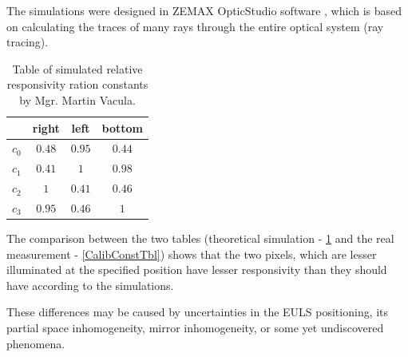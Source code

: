 \par
The simulations were designed in ZEMAX OpticStudio software \cite{zemax}, which is based on calculating the traces of many rays through the entire optical system (ray tracing).



\begin{table}[H]
\centering
\begin{tabular}{|c|c|c|c|}
\hline
   & right & left & bottom \\ \hline
$c_0$ & $0.48$    & $0.95$   & $0.44$     \\ \hline
$c_1$ & $0.41$    & $1$   	 & $0.98$      \\ \hline
$c_2$ & $1$    	  & $0.41$   & $0.46$      \\ \hline
$c_3$ & $0.95$    & $0.46$   & $1$      \\ \hline
\end{tabular}
\caption{Table of simulated relative responsivity ration constants by Mgr. Martin Vacula.}
 \label{CalibConstTblSim}
\end{table}

The comparison between the two tables (theoretical simulation - \ref{CalibConstTblSim} and the real measurement - \ref{CalibConstTbl}) shows that the two pixels, which are lesser illuminated at the specified position have lesser responsivity than they should have according to the simulations.

\par
These differences may be caused by uncertainties in the EULS positioning, its partial space inhomogeneity, mirror inhomogeneity, or some yet undiscovered phenomena.





